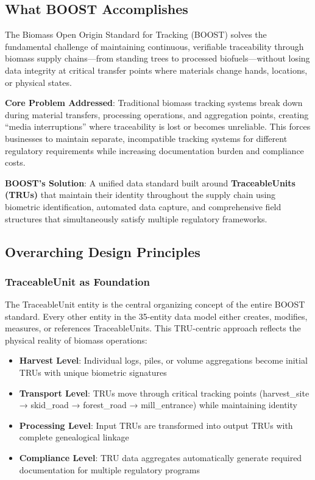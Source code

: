 
\subsection{What BOOST Accomplishes}
\label{sec:boost-purpose}

The Biomass Open Origin Standard for Tracking (BOOST) solves the fundamental challenge of maintaining continuous, verifiable traceability through biomass supply chains—from standing trees to processed biofuels—without losing data integrity at critical transfer points where materials change hands, locations, or physical states.

\textbf{Core Problem Addressed}: Traditional biomass tracking systems break down during material transfers, processing operations, and aggregation points, creating ``media interruptions'' where traceability is lost or becomes unreliable. This forces businesses to maintain separate, incompatible tracking systems for different regulatory requirements while increasing documentation burden and compliance costs.

\textbf{BOOST's Solution}: A unified data standard built around \textbf{TraceableUnits (TRUs)} that maintain their identity throughout the supply chain using biometric identification, automated data capture, and comprehensive field structures that simultaneously satisfy multiple regulatory frameworks.

\subsection{Overarching Design Principles}
\label{sec:design-principles}

\subsubsection{TraceableUnit as Foundation}

The TraceableUnit entity is the central organizing concept of the entire BOOST standard. Every other entity in the 35-entity data model either creates, modifies, measures, or references TraceableUnits. This TRU-centric approach reflects the physical reality of biomass operations:

\begin{itemize}
\item \textbf{Harvest Level}: Individual logs, piles, or volume aggregations become initial TRUs with unique biometric signatures
\item \textbf{Transport Level}: TRUs move through critical tracking points (harvest\_site → skid\_road → forest\_road → mill\_entrance) while maintaining identity
\item \textbf{Processing Level}: Input TRUs are transformed into output TRUs with complete genealogical linkage
\item \textbf{Compliance Level}: TRU data aggregates automatically generate required documentation for multiple regulatory programs
\end{itemize}

